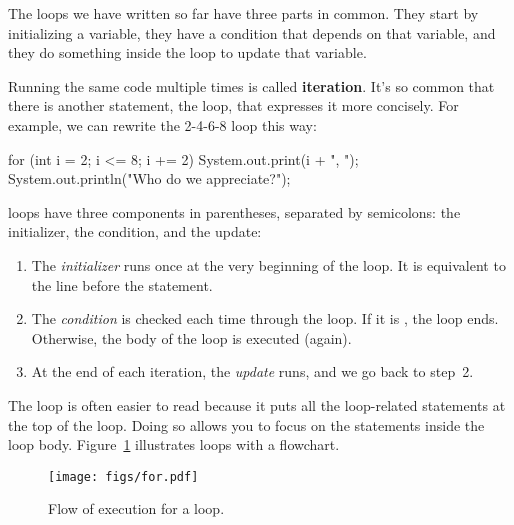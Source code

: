 
The loops we have written so far have three parts in common.
They start by initializing a variable, they have a condition that depends on that variable, and they do something inside the loop to update that variable.


Running the same code multiple times is called {\bf iteration}.
It's so common that there is another statement, the  loop, that expresses it more concisely.
For example, we can rewrite the 2-4-6-8 loop this way:

\begin{code}
for (int i = 2; i <= 8; i += 2) {
    System.out.print(i + ", ");
}
System.out.println("Who do we appreciate?");
\end{code}

 loops have three components in parentheses, separated by semicolons: the initializer, the condition, and the update:

\begin{enumerate}

\item The {\em initializer} runs once at the very beginning of the loop.
It is equivalent to the line before the  statement.

\item The {\em condition} is checked each time through the loop.
If it is , the loop ends.
Otherwise, the body of the loop is executed (again).

\item At the end of each iteration, the {\em update} runs, and we go back to step~2.

\end{enumerate}

The  loop is often easier to read because it puts all the loop-related statements at the top of the loop.
Doing so allows you to focus on the statements inside the loop body.
Figure~\ref{fig.for} illustrates  loops with a flowchart.


\begin{figure}[!ht]
\begin{center}
\texttt{[image: figs/for.pdf]}
\caption{Flow of execution for a  loop.}
\label{fig.for}
\end{center}
\end{figure}

